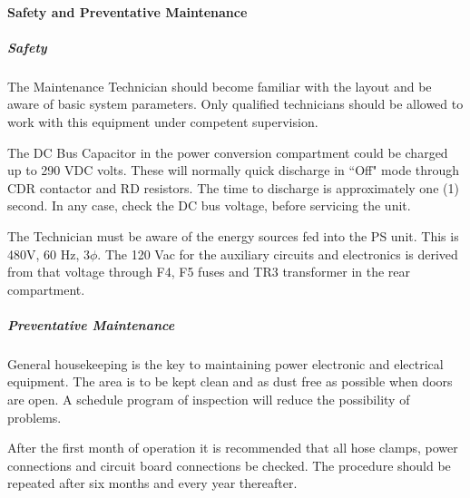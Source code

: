 \paragraph{Safety and Preventative Maintenance}

\subparagraph{Safety}

The Maintenance Technician should become familiar with the layout
and be aware of basic system parameters.  Only qualified technicians
should be allowed to work with this equipment under competent
supervision.

The DC Bus Capacitor in the power conversion compartment could be
charged up to 290 VDC volts.  These will normally quick discharge in
``Off" mode through CDR contactor and RD resistors.  The time to
discharge is approximately one (1) second.  In any case, check the DC
bus voltage, before servicing the unit.

The Technician must be aware of the energy sources fed into the
PS unit.  This is 480V, 60 Hz, 3$\phi$.  The 120 Vac for the auxiliary
circuits and electronics is derived from that voltage through F4, F5
fuses and TR3 transformer in the rear compartment.

\subparagraph{Preventative Maintenance}

General housekeeping is the key to maintaining power electronic
and electrical equipment.  The area is to be kept clean and as dust free
as possible when doors are open.  A schedule program of inspection will
reduce the possibility of problems.

After the first month of operation it is recommended that all
hose clamps, power connections and circuit board connections be checked.
 The procedure should be repeated after six months and every year
thereafter.

